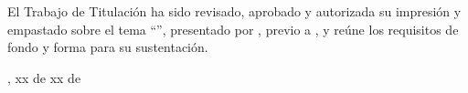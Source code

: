 
El Trabajo de Titulación ha sido revisado, aprobado y autorizada su impresión y empastado sobre el tema ``\UTITituloProyectoMayusculas'', presentado por \UTIAutoresTexto, previo a \UTIFraseObtencionTituloProfesional{}, y reúne los requisitos de fondo y forma para su sustentación.

\vspace{1.5cm}
\UTICiudadPais, xx de xx de \UTIAnio
\vspace{2.5cm}

\UTILectoresFirmaBloque